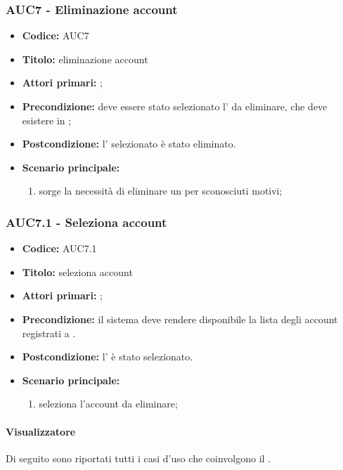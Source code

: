 \documentclass[casi-duso]{subfiles}
\begin{document}
\subsubsection{AUC7 - Eliminazione account}%
\label{subsub:AUC7}
\begin{itemize}
  \item \textbf{Codice:} AUC7
  \item \textbf{Titolo:} eliminazione account
  \item \textbf{Attori primari:} ;
  \item \textbf{Precondizione:} deve essere stato selezionato l' da eliminare, che deve esistere in ;
  \item \textbf{Postcondizione:} l' selezionato è stato eliminato.
  \item \textbf{Scenario principale:}
  \begin{enumerate}
    \item sorge la necessità di eliminare un  per sconosciuti motivi;
  \end{enumerate}
\end{itemize}


\subsubsection{AUC7.1 - Seleziona account}%
\label{subsub:AUC7.1}
\begin{itemize}
  \item \textbf{Codice:} AUC7.1
  \item \textbf{Titolo:} seleziona account
  \item \textbf{Attori primari:} ;
  \item \textbf{Precondizione:} il sistema deve rendere disponibile la lista degli account registrati a .
  \item \textbf{Postcondizione:} l' è stato selezionato.
  \item \textbf{Scenario principale:}
  \begin{enumerate}
    \item {} seleziona l'account da eliminare;
  \end{enumerate}
\end{itemize}

\paragraph{Visualizzatore}
Di seguito sono riportati tutti i casi d'uso che coinvolgono il  .
\end{document}
